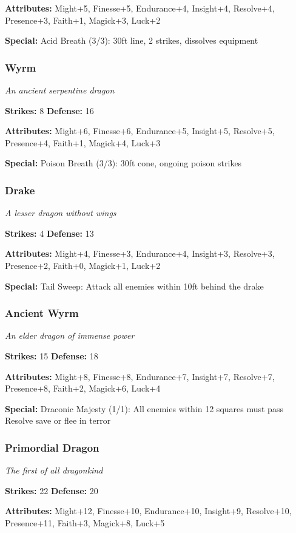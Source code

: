 \documentclass[10pt,twoside]{article}
\begin{document}
\textbf{Attributes:} Might+5, Finesse+5, Endurance+4, Insight+4, Resolve+4, Presence+3, Faith+1, Magick+3, Luck+2

\textbf{Special:} Acid Breath (3/3): 30ft line, 2 strikes, dissolves equipment

\subsubsection{Wyrm}
\textit{An ancient serpentine dragon}

\textbf{Strikes:} 8 \quad \textbf{Defense:} 16

\textbf{Attributes:} Might+6, Finesse+6, Endurance+5, Insight+5, Resolve+5, Presence+4, Faith+1, Magick+4, Luck+3

\textbf{Special:} Poison Breath (3/3): 30ft cone, ongoing poison strikes

\subsubsection{Drake}
\textit{A lesser dragon without wings}

\textbf{Strikes:} 4 \quad \textbf{Defense:} 13

\textbf{Attributes:} Might+4, Finesse+3, Endurance+4, Insight+3, Resolve+3, Presence+2, Faith+0, Magick+1, Luck+2

\textbf{Special:} Tail Sweep: Attack all enemies within 10ft behind the drake

\subsubsection{Ancient Wyrm}
\textit{An elder dragon of immense power}

\textbf{Strikes:} 15 \quad \textbf{Defense:} 18

\textbf{Attributes:} Might+8, Finesse+8, Endurance+7, Insight+7, Resolve+7, Presence+8, Faith+2, Magick+6, Luck+4

\textbf{Special:} Draconic Majesty (1/1): All enemies within 12 squares must pass Resolve save or flee in terror

\subsubsection{Primordial Dragon}
\textit{The first of all dragonkind}

\textbf{Strikes:} 22 \quad \textbf{Defense:} 20

\textbf{Attributes:} Might+12, Finesse+10, Endurance+10, Insight+9, Resolve+10, Presence+11, Faith+3, Magick+8, Luck+5
\end{document}
